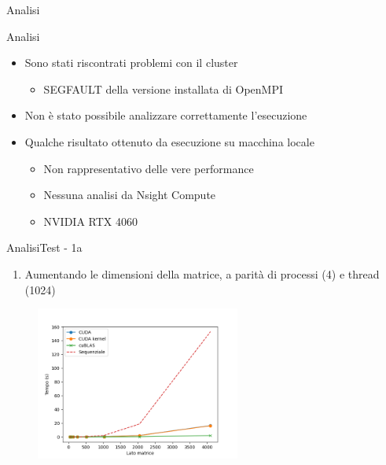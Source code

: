 \begin{frame}
    \centering \Huge
    Analisi
\end{frame}

\begin{frame}{Analisi}
    \begin{itemize}
        \item Sono stati riscontrati problemi con il cluster
              \begin{itemize}
                  \item SEGFAULT della versione installata di OpenMPI
              \end{itemize}
        \item Non è stato possibile analizzare correttamente l'esecuzione
        \item Qualche risultato ottenuto da esecuzione su macchina locale
              \begin{itemize}
                  \item Non rappresentativo delle vere performance
                  \item Nessuna analisi da Nsight Compute
                  \item NVIDIA RTX 4060 %
              \end{itemize}
    \end{itemize}
\end{frame}

\begin{frame}{Analisi}{Test - 1a}
    \begin{enumerate}
        \item[1a] Aumentando le dimensioni della matrice, a parità di processi (4) e thread (1024)
    \end{enumerate}

    \begin{figure}[H]
        \centering
        \includegraphics[width=0.6\textwidth]{./imgs/graphs/caso_0.png}
    \end{figure}
\end{frame}

